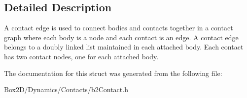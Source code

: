 \subsection{Detailed Description}
A contact edge is used to connect bodies and contacts together in a contact graph where each body is a node and each contact is an edge. A contact edge belongs to a doubly linked list maintained in each attached body. Each contact has two contact nodes, one for each attached body. 

The documentation for this struct was generated from the following file\+:\begin{DoxyCompactItemize}
\item 
Box2\+D/\+Dynamics/\+Contacts/b2\+Contact.\+h\end{DoxyCompactItemize}

